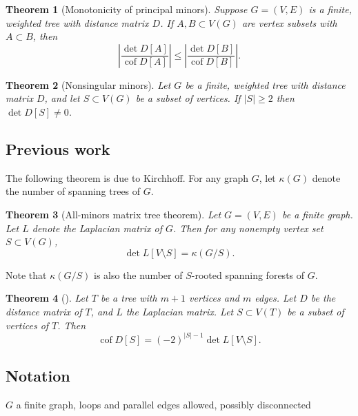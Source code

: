 \documentclass{amsart}
\newtheorem{thm}{Theorem}
\theoremstyle{definition}
\DeclareMathOperator{\cof}{cof}
\begin{document}
\begin{thm}[Monotonicity of principal minors]
Suppose $G = (V,E)$ is a finite, weighted tree with distance matrix $D$.
If $A,B \subset V(G)$
are vertex subsets with
$A \subset B$,
then
\begin{equation*}
\left| \frac{\det D[A]}{\cof D[A]} \right| \leq \left| \frac{\det D[B]}{\cof D[B]} \right| .
\end{equation*}
\end{thm}

\begin{thm}[Nonsingular minors]
Let $G$ be a finite, weighted tree
with distance matrix $D$,
and let $S \subset V(G)$ be a subset of vertices.
If $|S|\geq 2$ then $\det D[S] \neq 0$.
\end{thm}

\subsection{Previous work} 

The following theorem is due to Kirchhoff.
For any graph $G$, let $\kappa(G)$ denote the number of spanning trees of $G$.
\begin{thm}[All-minors matrix tree theorem]
Let $G = (V,E)$ be a finite graph.
Let $L$ denote the Laplacian matrix of $G$.
Then for any nonempty vertex set $S \subset V(G)$,
\begin{equation}
\det L[V \setminus S] = \kappa( G / S) .
\end{equation}
\end{thm}
Note that $\kappa(G/S)$ is also the number of $S$-rooted spanning forests of $G$.


\begin{thm}[\cite{bapat-sivasubramanian}]
Let $T$ be a tree with $m+1$ vertices and $m$ edges.
Let $D$ be the distance matrix of $T$, and $L$ the Laplacian matrix.
Let $S \subset V(T)$ be a subset of vertices of $T$. 
Then
\begin{equation*}
\cof D[S] = (-2)^{|S|-1} \det L[V \setminus S] .
\end{equation*}
\end{thm}

\subsection{Notation}


$G$ a finite graph, 
loops and parallel edges allowed,
possibly disconnected
\end{document}
